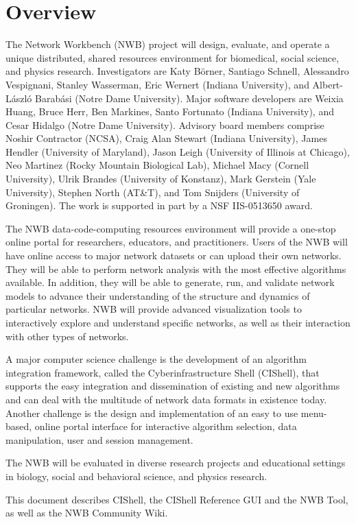 
\section{Overview}

The Network Workbench (NWB) project will design, evaluate, and operate a unique 
distributed, shared resources environment for biomedical, social science, 
and physics research. Investigators are Katy B\"{o}rner, Santiago Schnell, 
Alessandro Vespignani, Stanley Wasserman, Eric Wernert (Indiana University), 
and Albert-L\'{a}szl\'{o} Barab\'{a}si (Notre Dame University). Major software 
developers are Weixia Huang, Bruce Herr, Ben Markines, Santo Fortunato (Indiana 
University), and Cesar Hidalgo (Notre Dame University). Advisory board members 
comprise Noshir Contractor (NCSA), Craig Alan Stewart (Indiana University), 
James Hendler (University of Maryland), Jason Leigh (University of Illinois at 
Chicago), Neo Martinez (Rocky Mountain Biological Lab), Michael Macy (Cornell 
University), Ulrik Brandes (University of Konstanz), Mark Gerstein (Yale 
University), Stephen North (AT\&T), and Tom Snijders (University of Groningen). 
The work is supported in part by a NSF IIS-0513650 award.

The NWB data-code-computing resources environment will provide a one-stop 
online portal for researchers, educators, and practitioners. Users of the NWB 
will have online access to major network datasets or can upload their own 
networks. They will be able to perform network analysis with the most effective 
algorithms available. In addition, they will be able to generate, run, and 
validate network models to advance their understanding of the structure and 
dynamics of particular networks. NWB will provide advanced visualization tools 
to interactively explore and understand specific networks, as well as their 
interaction with other types of networks.

A major computer science challenge is the development of an algorithm 
integration framework, called the Cyberinfrastructure Shell (CIShell), that 
supports the easy integration and dissemination of existing and new algorithms 
and can deal with the multitude of network data formats in existence today. 
Another challenge is the design and implementation of an easy to use 
menu-based, online portal interface for interactive algorithm selection, data 
manipulation, user and session management.

The NWB will be evaluated in diverse research projects and educational settings 
in biology, social and behavioral science, and physics research.

This document describes CIShell, the CIShell Reference GUI and the NWB Tool, as 
well as the NWB Community Wiki.


